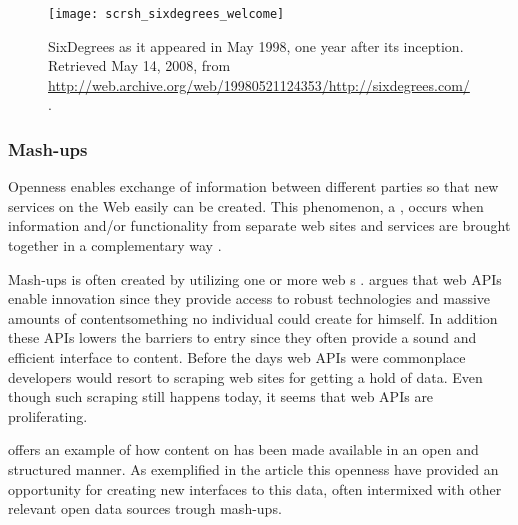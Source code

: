 \begin{figure}
  \centering
  \texttt{[image: scrsh\_sixdegrees\_welcome]}
  \caption[SixDegrees Welcome Page]{
    SixDegrees as it appeared in May 1998, one year after its
    inception. Retrieved May 14, 2008, from
    \url{http://web.archive.org/web/19980521124353/http://sixdegrees.com/}.
  }
  \label{figure:scrsh.sixdegrees.welcome}
\end{figure}

\subsubsection{Mash-ups}
Openness enables exchange of information between
different parties so that new services on the Web easily can be created.
This phenomenon, a %
,
occurs when information and/or functionality from separate web sites and
services are brought together in a complementary way
\citep[]{murugesan07}.

Mash-ups is often created by utilizing one or more web s%
.
\citet[]{floyd07} argues that web APIs enable innovation since they
provide access to robust technologies and massive amounts of
content\dash{}something no individual could create for himself. In addition
these APIs lowers the barriers to entry since they often provide a sound
and efficient interface to content. Before the days web APIs were commonplace
developers would resort to scraping web sites for getting a hold of data.
Even though such scraping still happens today, it seems that web APIs are
proliferating.

\citet{auer07} offers an example of how content on %
has been made available in an open and structured manner. As exemplified
in the article this openness have provided an opportunity for creating new
interfaces to this data, often intermixed with other relevant open
data sources trough mash-ups.

